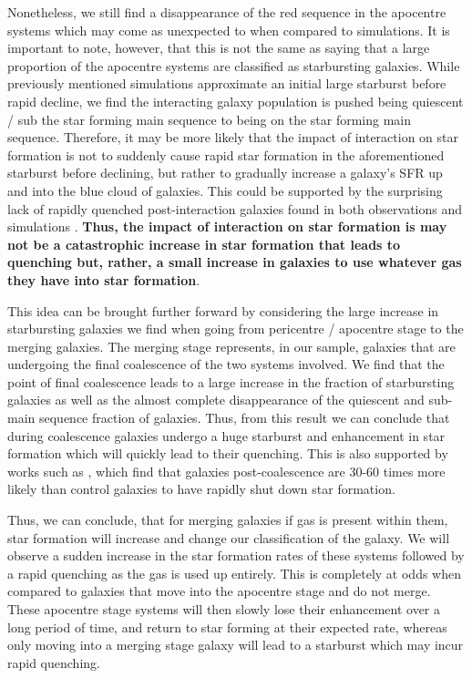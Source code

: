 Nonetheless, we still find a disappearance of the red sequence in the apocentre systems which may come as unexpected to when compared to simulations. It is important to note, however, that this is not the same as saying that a large proportion of the apocentre systems are classified as starbursting galaxies. While previously mentioned simulations approximate an initial large starburst before rapid decline, we find the interacting galaxy population is pushed being quiescent / sub the star forming main sequence to being on the star forming main sequence. Therefore, it may be more likely that the impact of interaction on star formation is not to suddenly cause rapid star formation in the aforementioned starburst before declining, but rather to gradually increase a galaxy's SFR up and into the blue cloud of galaxies. This could be supported by the surprising lack of rapidly quenched post-interaction galaxies found in both observations \citep{2017ApJ...845..145W} and simulations \citep{2020MNRAS.493.3716H, 2021MNRAS.504.1888Q}. \textbf{Thus, the impact of interaction on star formation is may not be a catastrophic increase in star formation that leads to quenching but, rather, a small increase in galaxies to use whatever gas they have into star formation}. %

This idea can be brought further forward by considering the large increase in starbursting galaxies we find when going from pericentre / apocentre stage to the merging galaxies. The merging stage represents, in our sample, galaxies that are undergoing the final coalescence of the two systems involved. We find that the point of final coalescence leads to a large increase in the fraction of starbursting galaxies as well as the almost complete disappearance of the quiescent and sub-main sequence fraction of galaxies. Thus, from this result we can conclude that during coalescence galaxies undergo a huge starburst and enhancement in star formation which will quickly lead to their quenching. This is also supported by works such as \citet{2022MNRAS.517L..92E}, which find that galaxies post-coalescence are 30-60 times more likely than control galaxies to have rapidly shut down star formation.

Thus, we can conclude, that for merging galaxies if gas is present within them, star formation will increase and change our classification of the galaxy. We will observe a sudden increase in the star formation rates of these systems followed by a rapid quenching as the gas is used up entirely. This is completely at odds when compared to galaxies that move into the apocentre stage and do not merge. These apocentre stage systems will then slowly lose their enhancement over a long period of time, and return to star forming at their expected rate, whereas only moving into a merging stage galaxy will lead to a starburst which may incur rapid quenching.

